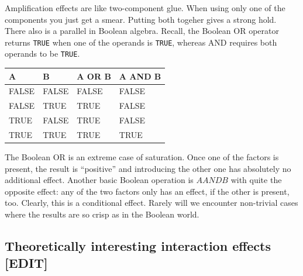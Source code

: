 \documentclass[]{svmono}
\newenvironment{Shaded}{\begin{snugshade}}{\end{snugshade}}
\newcommand{\KeywordTok}[1]{\textcolor[rgb]{0.13,0.29,0.53}{\textbf{#1}}}
\newcommand{\DataTypeTok}[1]{\textcolor[rgb]{0.13,0.29,0.53}{#1}}
\newcommand{\StringTok}[1]{\textcolor[rgb]{0.31,0.60,0.02}{#1}}
\newcommand{\OperatorTok}[1]{\textcolor[rgb]{0.81,0.36,0.00}{\textbf{#1}}}
\newcommand{\NormalTok}[1]{#1}
\theoremstyle{definition}
\theoremstyle{definition}
\theoremstyle{definition}
\theoremstyle{remark}
\begin{document}
Amplification effects are like two-component glue. When using only one
of the components you just get a smear. Putting both togeher gives a
strong hold. There also is a parallel in Boolean algebra. Recall, the
Boolean OR operator returns \texttt{TRUE} when one of the operands is
\texttt{TRUE}, whereas AND requires both operands to be \texttt{TRUE}.

\begin{Shaded}
\end{Shaded}

\begin{tabular}{l|l|l|l}
\hline
A & B & A OR B & A AND B\\
\hline
FALSE & FALSE & FALSE & FALSE\\
\hline
FALSE & TRUE & TRUE & FALSE\\
\hline
TRUE & FALSE & TRUE & FALSE\\
\hline
TRUE & TRUE & TRUE & TRUE\\
\hline
\end{tabular}

The Boolean OR is an extreme case of saturation. Once one of the factors
is present, the result is ``positive'' and introducing the other one has
absolutely no additional effect. Another basic Boolean operation is
\(A AND B\) with quite the opposite effect: any of the two factors only
has an effect, if the other is present, too. Clearly, this is a
conditional effect. Rarely will we encounter non-trivial cases where the
results are so crisp as in the Boolean world.

\subsection{Theoretically interesting interaction effects
{[}EDIT{]}}\label{theoretically-interesting-interaction-effects-edit}
\end{document}
